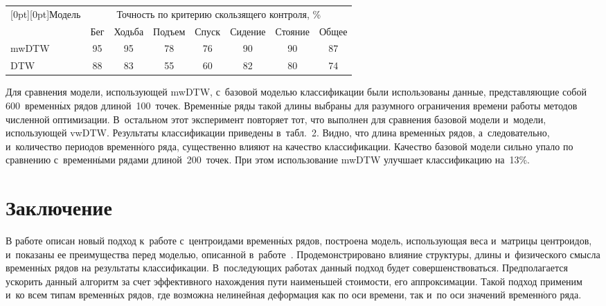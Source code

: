 \begin{multicols}{2}
\begin{table*}\small %
\vspace*{-12pt}
\begin{center}
\vspace*{2ex}

\tabcolsep=14.7pt
\begin{tabular}{|l|c|c|c|c|c|c|c|}
        \hline
       \multicolumn{1}{|c|}{\raisebox{-6pt}[0pt][0pt]{Модель}} &\multicolumn{7}{c|}{Точность по критерию
        скользящего контроля, \%}\\
                \cline{2-8}
        &{Бег} & {Ходьба} & {Подъем} & {Спуск} & {Сидение} & {Стояние}& {Общее} \\
        \hline
   mwDTW  & 95 & 95 & 78 & 76 & 90 & 90 & 87\\
  DTW \cite{Goncharov} & 88 & 83 & 55 & 60 & 82 & 80 & 74\\
                \hline
\end{tabular}
\end{center}
\end{table*}

 Для сравнения модели, использующей mwDTW, с~базовой моделью классификации были 
 использованы данные, представляющие собой 600~вре\-мен\-н$\acute{\mbox{ы}}$х 
 рядов длиной~100~точек. 
 Временн$\acute{\mbox{ы}}$е ряды такой длины выбраны для разумного 
 ограничения времени работы методов 
 численной оптимизации. В~остальном этот эксперимент повторяет тот, 
 что выполнен для 
 сравнения базовой модели и~модели, использующей vwDTW. 
 Результаты   классификации 
 приведены в~табл.~2. Видно, что длина временн$\acute{\mbox{ы}}$х рядов, а~следовательно, и~количество 
 периодов временн$\acute{\mbox{о}}$го ряда, существенно влияют на качество классификации. Качество 
 базовой модели сильно упало по сравнению с~временн$\acute{\mbox{ы}}$ми рядами длиной~200~точек. 
 При этом использование mwDTW улучшает классификацию на~13\%.



\section{Заключение}

В работе описан новый подход к~работе с~центроидами временн$\acute{\mbox{ы}}$х рядов, построена модель, 
использующая веса и~матрицы центроидов, и~показаны ее преимущества перед моделью, 
описанной в~работе~\cite{Goncharov}. Продемонстрировано влияние структуры, длины 
и~физического смысла временн$\acute{\mbox{ы}}$х рядов на результаты классификации. 
В~последующих работах данный подход будет совершенствоваться. Предполагается ускорить 
данный алгоритм за счет эффективного нахождения пути наименьшей стоимости, его 
аппроксимации. Такой подход применим и~ко всем типам временн$\acute{\mbox{ы}}$х рядов, где возможна 
нелинейная деформация как по оси времени, так и~по оси значений временн$\acute{\mbox{о}}$го ряда.


\end{multicols}
